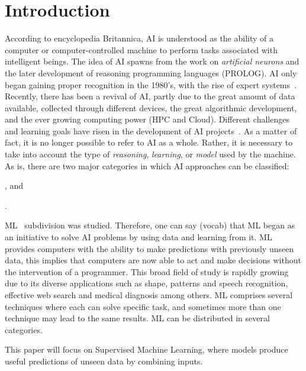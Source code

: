 
\section{Introduction}
\label{sec:introduction}

According to encyclopedia Britannica, \ac{AI} is understood as the ability of a computer or 
computer-controlled machine to perform tasks associated with intelligent beings. The idea of 
\ac{AI} spawns from the work on \textit{artificial neurons} and the later development of reasoning 
programming languages (\eg PROLOG). \ac{AI} only began gaining proper recognition in the 
1980's, with the rise of expert systems~\cite{russel09}.  Recently, there has been a revival of 
\ac{AI}, partly due to the great amount of data available, collected through different devices, the 
great algorithmic development, and the ever growing computing power (\ie \ac{HPC} and Cloud). 
Different challenges and learning goals have risen in the development of \ac{AI} 
projects~\cite{russel09}. As a matter of fact, it is no longer possible to refer to \ac{AI} as a whole. 
Rather, it is necessary to take into account the type of \emph{reasoning}, \emph{learning}, or \emph{model} used by the machine. As is, there are two major categories in which \ac{AI} approaches can be classified:
\begin{enumerate*}[label=(\arabic*)]
\item {}, and
\item .
\end{enumerate*}

\ac{ML}~\cite{watkins92} subdivision was studied. Therefore, one can say (vocab) that \ac{ML} began as an initiative to solve AI problems by using data and learning from it. ML provides computers with the ability to make predictions with previously unseen data, this implies that computers are now able to act and make decisions without the intervention of a programmer. This broad field of study is rapidly growing due to its diverse applications such as shape, patterns and speech recognition, effective web search and medical diagnosis among others. ML comprises several techniques where each can solve specific task, and sometimes more than one technique may lead to the same results. ML can be distributed in several categories.

This paper will focus on Supervised Machine Learning, where models produce useful predictions of unseen data by combining inputs.  


